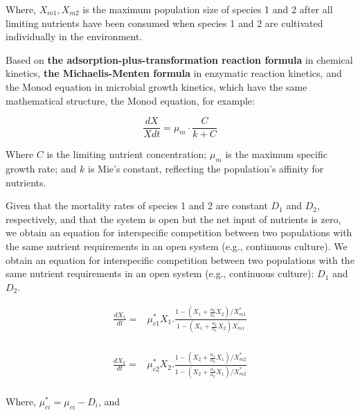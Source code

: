 \documentclass{mcmthesis}
\begin{document}
Where, $X_{m 1}, X_{m 2}$ is the maximum population size of species 1 and 2
after all limiting nutrients have been consumed when species 1 and 2 are cultivated individually in the environment.

Based on \textbf{the adsorption-plus-transformation reaction formula} in chemical kinetics,
\textbf{the Michaelis-Menten formula} in enzymatic reaction kinetics, and the Monod equation in microbial growth kinetics,
which have the same mathematical structure, the Monod equation, for example:

\begin{equation}
  \frac{d X}{X d t}=\mu_{m} \cdot \frac{C}{k+C}
\end{equation}

Where $C$ is the limiting nutrient concentration;
$\mu_{m}$ is the maximum specific growth rate; and $k$ is Mie's constant, reflecting the population's affinity for nutrients.

Given that the mortality rates of species 1 and 2 are constant $D_{1}$ and $D_{2}$, respectively,
and that the system is open but the net input of nutrients is zero,
we obtain an equation for interspecific competition between two populations
with the same nutrient requirements in an open system (e.g., continuous culture).
We obtain an equation for interspecific competition between two populations
with the same nutrient requirements in an open system (e.g., continuous culture): $D_{1}$ and $D_{2}$.

\begin{equation}
  \begin{aligned}
    \frac{d X_{1}}{d t}= & \mu_{c 1}^{*} X_{1}.\frac{1-\left(X_{1}+\frac{a_{2}}{a_{1}} X_{2}\right) / X_{m 1}^{*}}{1-\left(X_{1}+\frac{a_{2}}{\alpha_{1}} X_{2}\right) X_{m 1}^{\prime}} \\ 
  \end{aligned}
\end{equation}

\begin{equation}
  \begin{aligned}
    \frac{d X_{2}}{d t}= & \mu_{c 2}^{*} X_{2}.\frac{1-\left(X_{2}+\frac{\alpha_{1}}{\alpha_{2}} X_{1}\right) / X_{m 2}^{*}}{1-\left(X_{2}+\frac{\alpha_{1}}{a_{2}} X_{1}\right) / X_{m 2}^{*}}\\
  \end{aligned}
\end{equation}

Where, $\mu_{c i}^{*}=\mu_{c i}-D_{i}$, and
\end{document}

